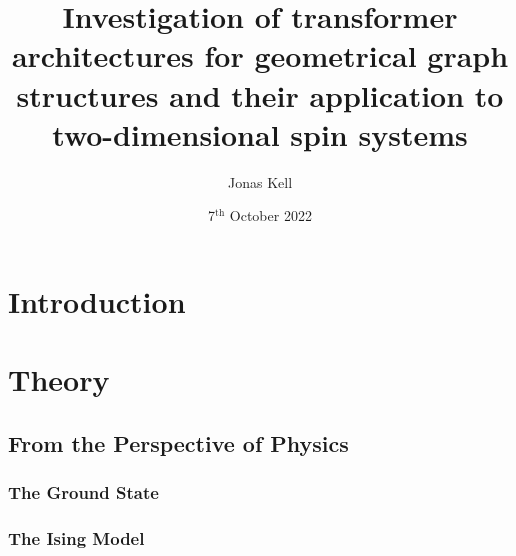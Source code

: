 \documentclass[
headings=optiontohead,              %
12pt,                               %
DIV=13,                             %
twoside=false,                      %
open=right,                         %
BCOR=00mm,                          %
toc=bibliographynumbered            %
]{scrreport}
\title{Investigation of transformer architectures for geometrical graph structures and their application to two-dimensional spin systems}
\author{Jonas Kell}
\date{7$^\text{th}$ October 2022}
\begin{document}
\thispagestyle{empty}                           %
\cleardoublepage                                %
\pagestyle{scrheadings}                         %
\renewcommand{\contentsname}{Table of Contents} %
\tableofcontents                                %
\cleardoublepage                                %

\clearpairofpagestyles
\ihead{\leftmark}
\ohead{\Ifstr{\leftmark}{\rightmark}{}{\rightmark}}
\cfoot*{\pagemark}


\chapter{Introduction}
\label{sec:introduction}

\FloatBarrier
\chapter{Theory}
\label{sec:theory}
    \section{From the Perspective of Physics}
        \label{sec:theory-physics}
        
        \FloatBarrier
        \subsection{The Ground State}
        \label{sec:theory-groundstatesearch}
        
        \subsection{The Ising Model}
        \label{sec:theory-ising}
        
        \FloatBarrier
\end{document}

